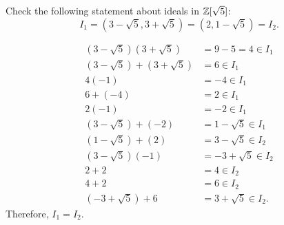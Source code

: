\setcounter{question}{35}
\question Check the following statement about ideals in $\mathbb{Z}[\sqrt 5]$:
\[ I_1 = (3 - \sqrt 5, 3 + \sqrt 5) = (2, 1 - \sqrt 5) = I_2. \]
\begin{solution}
    \begin{align*}
        (3 - \sqrt 5)(3 + \sqrt 5) &= 9 - 5 = 4 \in I_1 \\
        (3 - \sqrt 5) + (3 + \sqrt 5) &= 6 \in I_1 \\
        4 (-1) &= -4 \in I_1 \\
        6 + (-4) &= 2 \in I_1 \\
        2 (-1) &= -2 \in I_1 \\
        (3 - \sqrt 5) + (-2) &= 1 - \sqrt 5 \in I_1 \\
        (1 - \sqrt 5) + (2) &= 3 - \sqrt 5 \in I_2 \\
        (3 - \sqrt 5) (-1) &= -3 + \sqrt 5 \in I_2 \\
        2 + 2 &= 4 \in I_2 \\
        4 + 2 &= 6 \in I_2 \\
        (-3 + \sqrt 5) + 6 &= 3 + \sqrt 5 \in I_2.
    \end{align*}
    Therefore, $I_1 = I_2$.
\end{solution}
